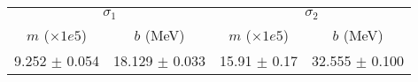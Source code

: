 \begin{tabular}{cc|cc}
\multicolumn{2}{c|}{$\sigma_1$} & \multicolumn{2}{|c}{$\sigma_2$} \\
$m$ ($\times1e5$) & $b$ (MeV) & $m$ ($\times1e5$) & $b$ (MeV) \\
\hline
9.252 $\pm$ 0.054 & 18.129 $\pm$ 0.033 & 15.91 $\pm$ 0.17 & 32.555 $\pm$ 0.100\\
\end{tabular}
